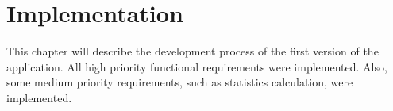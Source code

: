 
\chapter{Implementation}\label{ch:implementation}

This chapter will describe the development process of the first version of the application.
All high priority functional requirements  were implemented.
Also, some medium priority requirements, such as statistics calculation, were implemented.





